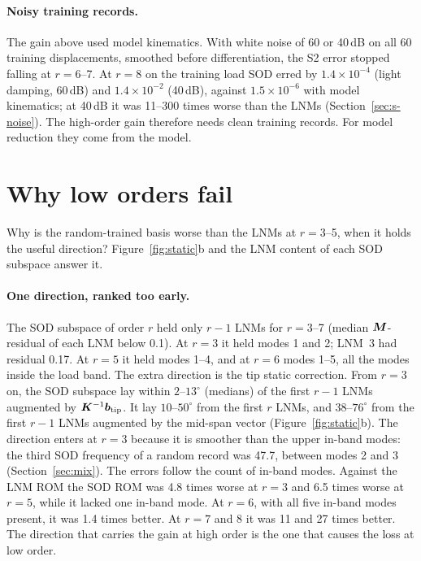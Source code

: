 \documentclass[preprint,12pt]{elsarticle}
\begin{document}
\paragraph{Noisy training records.} The gain above used model kinematics. With white noise of 60 or 40\,dB on all 60 training displacements, smoothed before differentiation, the S2 error stopped falling at $r=6$--7. At $r=8$ on the training load SOD erred by $1.4\times10^{-4}$ (light damping, 60\,dB) and $1.4\times10^{-2}$ (40\,dB), against $1.5\times10^{-6}$ with model kinematics; at 40\,dB it was 11--300 times worse than the LNMs (Section~\ref{sec:s-noise}). The high-order gain therefore needs clean training records. For model reduction they come from the model.



\section{Why low orders fail}\label{sec:displace}
Why is the random-trained basis worse than the LNMs at $r=3$--5, when it holds the useful direction?
Figure~\ref{fig:static}b and the LNM content of each SOD subspace answer it.

\paragraph{One direction, ranked too early.} The SOD subspace of order $r$ held only $r-1$ LNMs for $r=3$--7 (median $\bm{M}$-residual of each LNM below 0.1). At $r=3$ it held modes 1 and 2; LNM~3 had residual 0.17. At $r=5$ it held modes 1--4, and at $r=6$ modes 1--5, all the modes inside the load band.
The extra direction is the tip static correction. From $r=3$ on, the SOD subspace lay within $2$--$13^\circ$ (medians) of the first $r-1$ LNMs augmented by $\bm{K}^{-1}\bm{b}_{\mathrm{tip}}$. It lay $10$--$50^\circ$ from the first $r$ LNMs, and $38$--$76^\circ$ from the first $r-1$ LNMs augmented by the mid-span vector (Figure~\ref{fig:static}b).
The direction enters at $r=3$ because it is smoother than the upper in-band modes: the third SOD frequency of a random record was 47.7, between modes 2 and 3 (Section~\ref{sec:mix}).
The errors follow the count of in-band modes. Against the LNM ROM the SOD ROM was 4.8 times worse at $r=3$ and 6.5 times worse at $r=5$, while it lacked one in-band mode. At $r=6$, with all five in-band modes present, it was 1.4 times better. At $r=7$ and 8 it was 11 and 27 times better.
The direction that carries the gain at high order is the one that causes the loss at low order.
\end{document}
